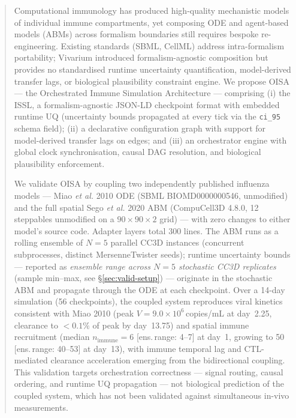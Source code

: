 \documentclass[conference,letterpaper,10pt]{IEEEtran}
\newcommand{\ttilde}{\raisebox{-0.5ex}{\textasciitilde}}
\begin{document}
\begin{abstract}
Computational immunology has produced high-quality mechanistic models of
individual immune compartments, yet composing ODE and agent-based models
(ABMs) across formalism boundaries still requires bespoke re-engineering.
Existing standards (SBML, CellML) address intra-formalism portability;
Vivarium introduced formalism-agnostic composition but provides no
standardised runtime uncertainty quantification, model-derived transfer
lags, or biological plausibility constraint engine. We propose OISA ---
the Orchestrated Immune Simulation Architecture --- comprising (i) the
ISSL, a formalism-agnostic JSON-LD checkpoint format with embedded
runtime UQ (uncertainty bounds propagated at every tick via the
\texttt{ci\_95} schema field); (ii) a declarative configuration graph
with support for model-derived transfer lags on edges; and (iii) an
orchestrator engine with global clock synchronisation, causal DAG
resolution, and biological plausibility enforcement.

We validate OISA by coupling two independently published influenza
models --- Miao \emph{et al.} 2010 ODE (SBML BIOMD0000000546,
unmodified) and the full spatial Sego \emph{et al.} 2020 ABM
(CompuCell3D 4.8.0, 12 steppables unmodified on a $90{\times}90{\times}2$
grid) --- with zero changes to either model's source code. Adapter
layers total \ttilde{}300 lines. The ABM runs as a rolling ensemble of
$N\!=\!5$ parallel CC3D instances (concurrent subprocesses, distinct
MersenneTwister seeds); runtime uncertainty bounds --- reported as
\emph{ensemble range across $N\!=\!5$ stochastic CC3D replicates}
(sample min--max, see \S\ref{sec:valid-setup}) --- originate in the
stochastic ABM and propagate through the ODE at each checkpoint. Over a
14-day simulation (56 checkpoints), the coupled system reproduces viral
kinetics consistent with Miao 2010 (peak
$V\!=\!9.0{\times}10^{6}$\,copies/mL at day~2.25, clearance to
$<\!0.1\%$ of peak by day~13.75) and spatial immune recruitment (median
$n_{\text{immune}}\!=\!6$ [ens.\,range: 4--7] at day~1, growing to 50
[ens.\,range: 40--53] at day~13), with immune temporal lag and
CTL-mediated clearance acceleration emerging from the bidirectional
coupling. This validation targets orchestration correctness --- signal
routing, causal ordering, and runtime UQ propagation --- not biological
prediction of the coupled system, which has not been validated against
simultaneous in-vivo measurements.
\end{abstract}
\end{document}
